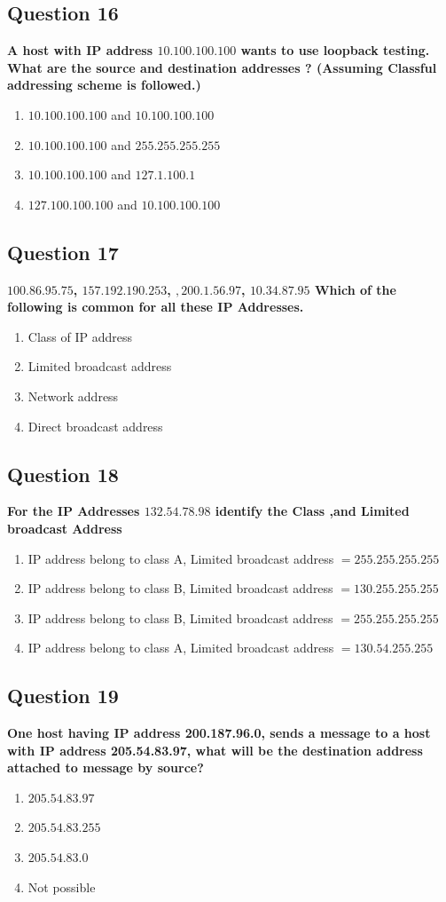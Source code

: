 \documentclass[12pt]{article}
\begin{document}
\subsection*{Question 16}
\textbf{A host with IP address $10.100.100.100$ wants to use loopback testing. What are the source and destination addresses ? (Assuming Classful addressing scheme is followed.)}
\begin{enumerate}[label=(\Alph*)]
    \item $10.100.100.100$ and $10.100.100.100$
    \item $10.100.100.100$ and $255.255.255.255$
    \item $10.100.100.100$ and $127.1.100.1$
    \item $127.100.100.100$ and $10.100.100.100$
\end{enumerate}

\subsection*{Question 17}
\textbf{$100.86.95.75$, $157.192.190.253$, $,200.1.56.97$, $10.34.87.95$ Which of the following is common for all
these IP Addresses.}
\begin{enumerate}
    \item Class of IP address
    \item Limited broadcast address
    \item Network address
    \item Direct broadcast address
\end{enumerate}

\subsection*{Question 18}
\textbf{For the IP Addresses $132.54.78.98$ identify the Class ,and Limited broadcast Address}
\begin{enumerate}
    \item IP address belong to class A, Limited broadcast address $= 255.255.255.255$
    \item IP address belong to class B, Limited broadcast address $= 130.255.255.255$
    \item IP address belong to class B, Limited broadcast address $= 255.255.255.255$
    \item IP address belong to class A, Limited broadcast address $= 130.54.255.255$
\end{enumerate}

\subsection*{Question 19}
\textbf{One host having IP address 200.187.96.0, sends a message to a host with IP address 205.54.83.97, what will be the destination address attached to message by source?}
\begin{enumerate}
    \item $205.54.83.97$
    \item $205.54.83.255$
    \item $205.54.83.0$
    \item Not possible
\end{enumerate}
\end{document}
